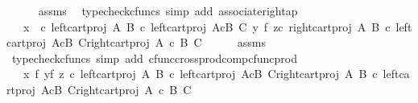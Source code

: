 \begin{isabellebody}
\ \ \ \ \isamarkupfalse%
\ assms\ \isamarkupfalse%
\ {\isacharparenleft}{\kern0pt}typecheck{\isacharunderscore}{\kern0pt}cfuncs{\isacharcomma}{\kern0pt}\ simp\ add{\isacharcolon}{\kern0pt}\ associate{\isacharunderscore}{\kern0pt}right{\isacharunderscore}{\kern0pt}ap{\isacharparenright}{\kern0pt}\isanewline
\ \ \isamarkupfalse%
\ \isamarkupfalse%
\ {\isachardoublequoteopen}{\isachardot}{\kern0pt}{\isachardot}{\kern0pt}{\isachardot}{\kern0pt}\ {\isacharequal}{\kern0pt}\ {\isasymlangle}x\ \ {\isasymcirc}\isactrlsub c\ left{\isacharunderscore}{\kern0pt}cart{\isacharunderscore}{\kern0pt}proj\ A\ B\ {\isasymcirc}\isactrlsub c\ left{\isacharunderscore}{\kern0pt}cart{\isacharunderscore}{\kern0pt}proj\ {\isacharparenleft}{\kern0pt}A{\isasymtimes}\isactrlsub cB{\isacharparenright}{\kern0pt}\ C{\isacharcomma}{\kern0pt}\ {\isacharparenleft}{\kern0pt}y\ {\isasymtimes}\isactrlsub f\ z{\isacharparenright}{\kern0pt}{\isasymcirc}\isactrlsub c\ {\isasymlangle}right{\isacharunderscore}{\kern0pt}cart{\isacharunderscore}{\kern0pt}proj\ A\ B\ {\isasymcirc}\isactrlsub c\ left{\isacharunderscore}{\kern0pt}cart{\isacharunderscore}{\kern0pt}proj\ {\isacharparenleft}{\kern0pt}A{\isasymtimes}\isactrlsub cB{\isacharparenright}{\kern0pt}\ C{\isacharcomma}{\kern0pt}right{\isacharunderscore}{\kern0pt}cart{\isacharunderscore}{\kern0pt}proj\ {\isacharparenleft}{\kern0pt}A\ {\isasymtimes}\isactrlsub c\ B{\isacharparenright}{\kern0pt}\ C{\isasymrangle}{\isasymrangle}{\isachardoublequoteclose}\isanewline
\ \ \ \ \isamarkupfalse%
\ assms\ \isamarkupfalse%
\ {\isacharparenleft}{\kern0pt}typecheck{\isacharunderscore}{\kern0pt}cfuncs{\isacharcomma}{\kern0pt}\ simp\ add{\isacharcolon}{\kern0pt}\ cfunc{\isacharunderscore}{\kern0pt}cross{\isacharunderscore}{\kern0pt}prod{\isacharunderscore}{\kern0pt}comp{\isacharunderscore}{\kern0pt}cfunc{\isacharunderscore}{\kern0pt}prod{\isacharparenright}{\kern0pt}\isanewline
\ \ \isamarkupfalse%
\ \isamarkupfalse%
\ {\isachardoublequoteopen}{\isachardot}{\kern0pt}{\isachardot}{\kern0pt}{\isachardot}{\kern0pt}\ {\isacharequal}{\kern0pt}\ {\isacharparenleft}{\kern0pt}x\ {\isasymtimes}\isactrlsub f\ {\isacharparenleft}{\kern0pt}y{\isasymtimes}\isactrlsub f\ z{\isacharparenright}{\kern0pt}{\isacharparenright}{\kern0pt}\ {\isasymcirc}\isactrlsub c\ {\isasymlangle}left{\isacharunderscore}{\kern0pt}cart{\isacharunderscore}{\kern0pt}proj\ A\ B\ {\isasymcirc}\isactrlsub c\ left{\isacharunderscore}{\kern0pt}cart{\isacharunderscore}{\kern0pt}proj\ {\isacharparenleft}{\kern0pt}A{\isasymtimes}\isactrlsub cB{\isacharparenright}{\kern0pt}\ C{\isacharcomma}{\kern0pt}{\isasymlangle}right{\isacharunderscore}{\kern0pt}cart{\isacharunderscore}{\kern0pt}proj\ A\ B\ {\isasymcirc}\isactrlsub c\ left{\isacharunderscore}{\kern0pt}cart{\isacharunderscore}{\kern0pt}proj\ {\isacharparenleft}{\kern0pt}A{\isasymtimes}\isactrlsub cB{\isacharparenright}{\kern0pt}\ C{\isacharcomma}{\kern0pt}right{\isacharunderscore}{\kern0pt}cart{\isacharunderscore}{\kern0pt}proj\ {\isacharparenleft}{\kern0pt}A\ {\isasymtimes}\isactrlsub c\ B{\isacharparenright}{\kern0pt}\ C{\isasymrangle}{\isasymrangle}{\isachardoublequoteclose}\isanewline

\end{isabellebody}
